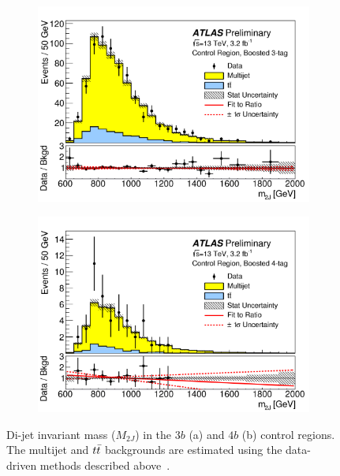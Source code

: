 \begin{figure}[h!]
  \centering
  \captionsetup{justification=centering}

   \begin{subfigure}[t]{0.5\textwidth}
        \centering
        \includegraphics[width=\textwidth]{figures/3b_control}
        \caption{}
    \end{subfigure}%
    \begin{subfigure}[t]{0.5\textwidth}
        \centering
        \includegraphics[width=\textwidth]{figures/4b_control}
        \caption{}
    \end{subfigure}

   \caption{Di-jet invariant mass ($M_{2J}$) in the $3b$ (a) and $4b$ (b) control regions. The multijet and $t\bar{t}$ backgrounds are estimated using the data-driven methods described above~\cite{4bconf}.}
  \label{fig:4b_control}
\end{figure}

